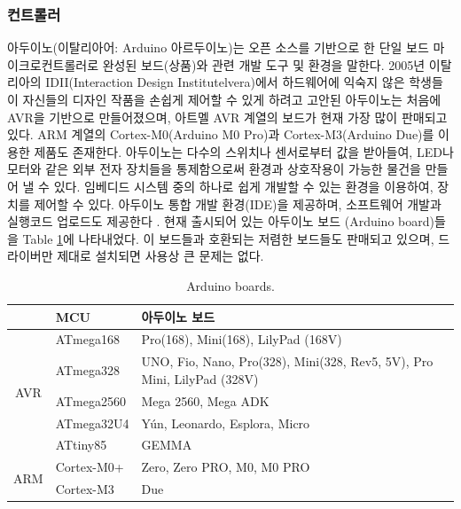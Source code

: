 \subsubsection{컨트롤러}

아두이노(이탈리아어: Arduino 아르두이노)는 오픈 소스를 기반으로 한 단일 보드 마이크로컨트롤러로 완성된 보드(상품)와 관련 개발 도구 및 환경을 말한다. 2005년 이탈리아의 IDII(Interaction Design Institutelvera)에서 하드웨어에 익숙지 않은 학생들이 자신들의 디자인 작품을 손쉽게 제어할 수 있게 하려고 고안된 아두이노는 처음에 AVR을 기반으로 만들어졌으며, 아트멜 AVR 계열의 보드가 현재 가장 많이 판매되고 있다. ARM 계열의 Cortex-M0(Arduino M0 Pro)과 Cortex-M3(Arduino Due)를 이용한 제품도 존재한다. 아두이노는 다수의 스위치나 센서로부터 값을 받아들여, LED나 모터와 같은 외부 전자 장치들을 통제함으로써 환경과 상호작용이 가능한 물건을 만들어 낼 수 있다. 임베디드 시스템 중의 하나로 쉽게 개발할 수 있는 환경을 이용하여, 장치를 제어할 수 있다.
아두이노 통합 개발 환경(IDE)을 제공하며, 소프트웨어 개발과 실행코드 업로드도 제공한다 \cite{wiki-arduino}. 
현재 출시되어 있는 아두이노 보드 (Arduino board)들을 Table \ref{table:arduino_boards}에 나타내었다. 이 보드들과 호환되는 저렴한 보드들도 판매되고 있으며, 드라이버만 제대로 설치되면 사용상 큰 문제는 없다. \cite{braun2009optical}

\begin{table}[]
	\caption{Arduino boards. \cite{wiki-arduino}}
	\begin{tabular}{c|l|l}
	\toprule[1pt]
		& MCU        & 아두이노 보드                                           \\ 
		\toprule[1pt]
	
		\multirow{5}{*}{AVR} & ATmega168  & Pro(168), Mini(168), LilyPad (168V)                                     \\
		& ATmega328  & UNO, Fio, Nano, Pro(328), Mini(328, Rev5, 5V), Pro Mini, LilyPad (328V) \\
		& ATmega2560 & Mega 2560, Mega ADK                                                     \\
		& ATmega32U4 & Yún, Leonardo, Esplora, Micro                                           \\
		& ATtiny85   & GEMMA                                                                   \\ 
		\midrule[1pt]
		\multirow{2}{*}{ARM} & Cortex-M0+ & Zero, Zero PRO, M0, M0 PRO                                              \\
		& Cortex-M3  & Due      \\
	\bottomrule[1pt]   
	\end{tabular}
	\label{table:arduino_boards}
\end{table}

